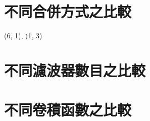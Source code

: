 \documentclass[class=NCU\_thesis, crop=false]{standalone}
\begin{document}
    \section{不同合併方式之比較}
    {(6, 1), (1, 3)}


    \section{不同濾波器數目之比較}
    

    \section{不同卷積函數之比較}
\end{document}
